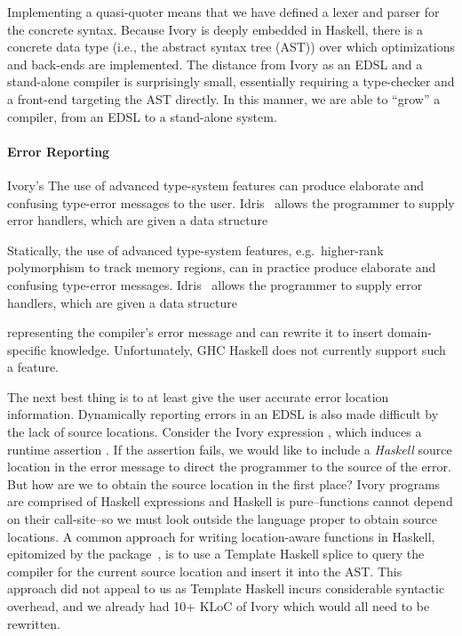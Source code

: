 Implementing a quasi-quoter means that we have defined a lexer and parser for
the concrete syntax. Because Ivory is deeply embedded in Haskell, there is a
concrete data type (i.e., the abstract syntax tree (AST)) over which
optimizations and back-ends are implemented. The distance from Ivory as an EDSL
and a stand-alone compiler is surprisingly small, essentially requiring a
type-checker and a front-end targeting the AST directly. In this manner, we are
able to ``grow'' a compiler, from an EDSL to a stand-alone system.

\paragraph{Error Reporting}
Ivory's The use of advanced type-system features can produce elaborate and
confusing type-error messages to the user. Idris~\cite{christiansen2014reflect}
allows the programmer to supply error handlers, which are given a data structure

Statically, the use of advanced type-system features, e.g.\ higher-rank
polymorphism to track memory regions, can in practice produce elaborate and
confusing type-error messages.
Idris~\cite{christiansen2014reflect} allows the
programmer to supply error handlers, which are given a data structure

representing the compiler's error message and can rewrite it to insert
domain-specific knowledge. Unfortunately, GHC Haskell does not currently support
such a feature.


The next best thing is to at least give the user accurate error location
information. Dynamically reporting errors in an EDSL is also made difficult by the lack of
source locations. Consider the Ivory expression \hbox{,} which induces a
runtime assertion . If the assertion fails, we would like to include
a \emph{Haskell} source location in the error message to direct the programmer to the source of
the error. But how are we to obtain the source location in the first place?
Ivory programs are comprised of Haskell expressions and Haskell is
pure--functions cannot depend on their call-site--so we must look outside the
language proper to obtain source locations. A common approach for writing
location-aware functions in Haskell, epitomized by the 
package~\cite{file-location}, is to use a Template Haskell splice to query the
compiler for the current source location and insert it into the AST. This
approach did not appeal to us as Template Haskell incurs considerable syntactic
overhead, and we already had 10+ KLoC of Ivory which would all need to be
rewritten.

